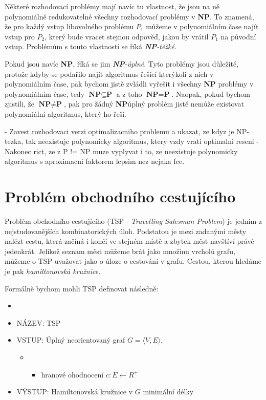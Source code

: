 \documentclass[
  biblatex,
  figures=false,
  glossaries,
  index
]{kidiplom}
\begin{document}
Některé rozhodovací problémy mají navíc tu vlastnost, že jsou na ně polynomiálně redukovatelné všechny rozhodovací problémy v \textbf{NP}. To znamená, že pro každý vstup libovolného problému $P_1$ můžeme v polynomiálním čase najít vstup pro $P_2$, který bude vracet stejnou odpověď, jakou by vrátil $P_1$ na původní vstup. Problémům s touto vlastností se říká \textit{\textbf{NP}-těžké}.

Pokud jsou navíc \textbf{NP}, říká se jim \textit{\textbf{NP}-úplné}. Tyto problémy jsou důležité, protože kdyby se podařilo najít algoritmus řešící kterýkoli z nich v polynomiálním čase, pak bychom jistě zvládli vyřešit i všechny \textbf{NP} problémy v polynomiálním čase, tedy $\textbf{NP} \subseteq \textbf{P}$ a z toho $\textbf{NP} = \textbf{P}$. Naopak, pokud bychom zjistili, že $\textbf{NP} \neq \textbf{P}$, pak pro žádný \textbf{NP}\textendash úplný problém jistě nemůže existovat polynomiální algoritmus, který ho řeší.

     - Zavest rozhodovaci verzi optimalizacniho problemu a ukazat, ze kdyz je NP-tezka,
       tak neexistuje polynomicky algoritmus, ktery vzdy vrati optimalni reseni
     - Nakonec rict, ze z P != NP muze vyplyvat i to, ze neexistuje polynomicky algoritmus
       s aproximacni faktorem lepsim nez nejaka fce.



\pagebreak
\section{Problém obchodního cestujícího}
Problém obchodního cestujícího (TSP - \textit{Travelling Salesman Problem}) je jedním z nejstudovanějších kombinatorických úloh. Podstatou je mezi zadanými městy nalézt cestu, která začíná i končí ve stejném místě a zbytek měst navštíví právě jedenkrát. Jelikož seznam měst můžeme brát jako množinu vrcholů grafu, můžeme o TSP uvažovat jako o úloze o cestování v grafu. Cestou, kterou hledáme je pak \textit{hamiltonovská kružnice}.

Formálně bychom mohli TSP definovat následně:
\begin{definition}
\begin{itemize}[label={}]
  \item
  \item NÁZEV: TSP
  \item VSTUP: Úplný neorientovaný graf $G=\langle V, E \rangle$,
  \begin{itemize}[label={}]
  \item \begin{itemize}[label={}]
  \item hranové ohodnocení $c : E \leftarrow R^+$
  \end{itemize}
  \end{itemize}
  \item VÝSTUP: Hamiltonovská kružnice v $G$ minimální délky
\end{itemize}
\end{definition}
\end{document}

